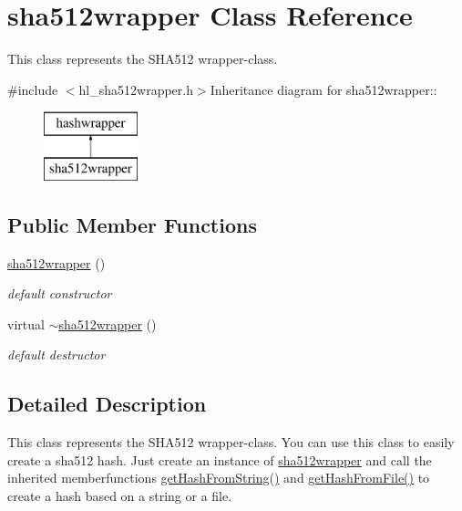 \hypertarget{classsha512wrapper}{
\section{sha512wrapper Class Reference}
\label{classsha512wrapper}
}


This class represents the SHA512 wrapper-\/class.  


{\ttfamily \#include $<$hl\_\-sha512wrapper.h$>$}Inheritance diagram for sha512wrapper::\begin{figure}[H]
\begin{center}
\leavevmode
\includegraphics[height=2cm]{classsha512wrapper}
\end{center}
\end{figure}
\subsection*{Public Member Functions}
\begin{DoxyCompactItemize}
\item 
\hyperlink{classsha512wrapper_aec38bb5768508acb8a40d9d309fa1e00}{sha512wrapper} ()
\begin{DoxyCompactList}\small\item\em default constructor \item\end{DoxyCompactList}\item 
virtual \hyperlink{classsha512wrapper_a4506794c3f6ec8bcf4d2108e1a91cc2a}{$\sim$sha512wrapper} ()
\begin{DoxyCompactList}\small\item\em default destructor \item\end{DoxyCompactList}\end{DoxyCompactItemize}


\subsection{Detailed Description}
This class represents the SHA512 wrapper-\/class. You can use this class to easily create a sha512 hash. Just create an instance of \hyperlink{classsha512wrapper}{sha512wrapper} and call the inherited memberfunctions \hyperlink{classhashwrapper_aa10904f0dc06eb54771ab26864622d0f}{getHashFromString()} and \hyperlink{classhashwrapper_ae4767e76e6d9e2b24b41f01ab9e7f03c}{getHashFromFile()} to create a hash based on a string or a file.


